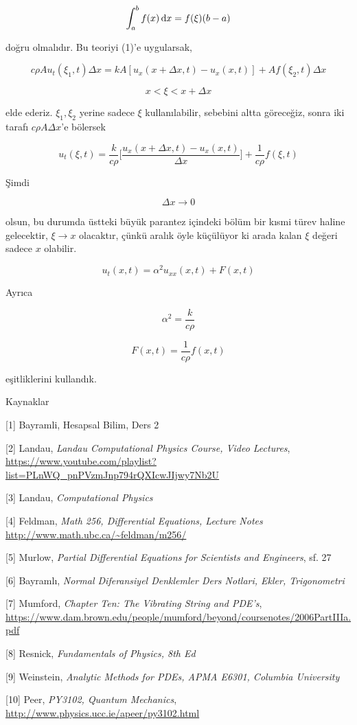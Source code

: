 \documentclass[12pt,fleqn]{article}\usepackage{../../common}
\begin{document}
$$ \int _{ a}^{b} f(x) \,\mathrm{d} x = f(\xi)(b-a)  $$

doğru olmalıdır. Bu teoriyi (1)'e uygularsak,

$$ c\rho A u_t(\xi_1,t)\Delta x = 
kA[u_x(x+\Delta x, t) - u_x(x,t)] + 
Af(\xi_2,t)\Delta x
 $$

$$ x < \xi < x+\Delta x $$

elde ederiz. $\xi_1,\xi_2$ yerine sadece $\xi$ kullanılabilir, sebebini
altta göreceğiz, sonra iki tarafı $c\rho A \Delta x$'e bölersek


$$
u_t(\xi,t) =  \frac{k}{c\rho}
\bigg[
\frac{u_x(x+\Delta x,t) - u_x(x,t)} {\Delta x}
\bigg]
+ \frac{ 1}{c\rho}f(\xi,t)
$$

Şimdi 

$$ \Delta x \to 0 $$

olsun, bu durumda üstteki büyük parantez içindeki bölüm bir kısmi türev
haline gelecektir, $\xi \to x$ olacaktır, çünkü aralık öyle küçülüyor ki
arada kalan $\xi$ değeri sadece $x$ olabilir.

$$ u_t(x,t) = \alpha^2u_{xx}(x,t) + F(x,t) $$

Ayrıca

$$ \alpha^2 = \frac{k}{c\rho} $$

$$ F(x,t) = \frac{1}{c\rho}f(x,t) $$

eşitliklerini kullandık. 

Kaynaklar

[1] Bayramli, Hesapsal Bilim, Ders 2 

[2] Landau, {\em Landau Computational Physics Course, Video Lectures},
    \url{https://www.youtube.com/playlist?list=PLnWQ_pnPVzmJnp794rQXIcwJIjwy7Nb2U}

[3] Landau, {\em Computational Physics}

[4] Feldman, {\em Math 256, Differential Equations, Lecture Notes}
    \url{http://www.math.ubc.ca/~feldman/m256/}

[5] Murlow, {\em Partial Differential Equations for Scientists and Engineers}, sf. 27

[6] Bayramlı, {\em Normal Diferansiyel Denklemler Ders Notlari, Ekler, Trigonometri}

[7] Mumford, {\em Chapter Ten: The Vibrating String and PDE's},
    \url{https://www.dam.brown.edu/people/mumford/beyond/coursenotes/2006PartIIIa.pdf}

[8] Resnick, {\em Fundamentals of Physics, 8th Ed}
    
[9] Weinstein, {\em Analytic Methods for PDEs, APMA E6301, Columbia University}

[10] Peer, {\em PY3102, Quantum Mechanics},
     \url{http://www.physics.ucc.ie/apeer/py3102.html}
\end{document}
